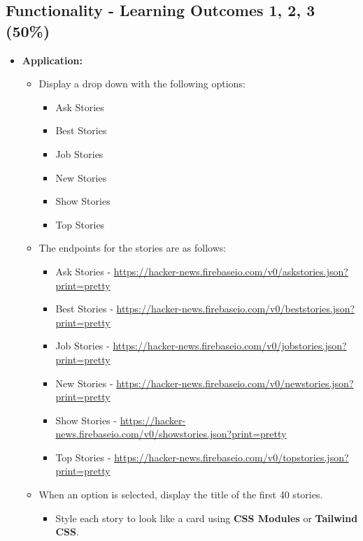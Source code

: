 \documentclass{article}
\begin{document}
\subsection*{Functionality - Learning Outcomes 1, 2, 3 (50\%)}
\begin{itemize}
	\item \textbf{Application:}
\begin{itemize}
	\item Display a drop down with the following options:
	\begin{itemize}
		\item Ask Stories
		\item Best Stories
		\item Job Stories
		\item New Stories
		\item Show Stories
		\item Top Stories
	\end{itemize}
	\item The endpoints for the stories are as follows:
	\begin{itemize}
		\item Ask Stories - \href{https://hacker-news.firebaseio.com/v0/askstories.json?print=pretty}{https://hacker-news.firebaseio.com/v0/askstories.json?print=pretty}
		\item Best Stories - \href{https://hacker-news.firebaseio.com/v0/beststories.json?print=pretty}{https://hacker-news.firebaseio.com/v0/beststories.json?print=pretty}
		\item Job Stories - \href{https://hacker-news.firebaseio.com/v0/jobstories.json?print=pretty}{https://hacker-news.firebaseio.com/v0/jobstories.json?print=pretty}
		\item New Stories - \href{https://hacker-news.firebaseio.com/v0/newstories.json?print=pretty}{https://hacker-news.firebaseio.com/v0/newstories.json?print=pretty}
		\item Show Stories - \href{https://hacker-news.firebaseio.com/v0/showstories.json?print=pretty}{https://hacker-news.firebaseio.com/v0/showstories.json?print=pretty}
		\item Top Stories - \href{https://hacker-news.firebaseio.com/v0/topstories.json?print=pretty}{https://hacker-news.firebaseio.com/v0/topstories.json?print=pretty}
	\end{itemize}
	\item When an option is selected, display the title of the first 40 stories.
	\begin{itemize}
		\item Style each story to look like a card using \textbf{CSS Modules} or \textbf{Tailwind CSS}.

\end{itemize}
\end{itemize}
\end{itemize}
\end{document}
